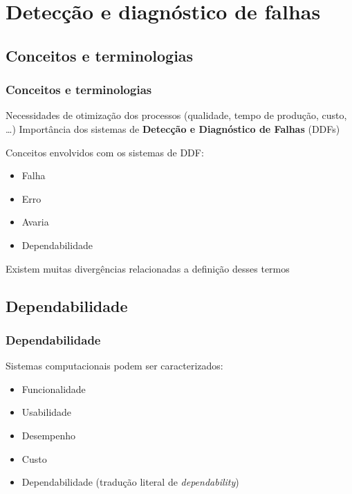 \documentclass{beamer}
\begin{document}
\section{Detecção e diagnóstico de falhas}
\subsection{Conceitos e terminologias}
\begin{frame}
    \frametitle{Conceitos e terminologias}

    Necessidades de otimização dos processos (qualidade, tempo de produção,
    custo, \ldots) \implica Importância dos sistemas de {\bf Detecção e 
    Diagnóstico de Falhas} (DDFs)

    \vspace{0.25cm}
    
    Conceitos envolvidos com os sistemas de DDF:

\begin{itemize}
    \item Falha
    \item Erro
    \item Avaria
    \item Dependabilidade
\end{itemize}

    Existem muitas divergências relacionadas a definição desses termos
\end{frame}

\subsection{Dependabilidade}
\begin{frame}
    \frametitle{Dependabilidade}

    Sistemas computacionais podem ser caracterizados:

\begin{itemize}
    \item Funcionalidade
    \item Usabilidade
    \item Desempenho
    \item Custo
    \item \alert{Dependabilidade} (tradução literal de {\it dependability})
\end{itemize}

\end{frame}
\end{document}
